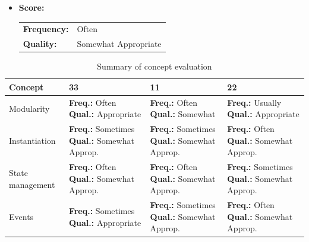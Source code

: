 \begin{itemize}
    \item \textbf{Score:}
    \begin{tabular}{ll}
        \textbf{Frequency:} & Often \\
        \textbf{Quality:}   & Somewhat Appropriate \\
    \end{tabular}
\end{itemize}



\renewcommand{\arraystretch}{1.1}

\begin{table}[h]
    \centering
    \footnotesize
    \begin{tabular}{
            >{\raggedright\arraybackslash}p{}
            >{\raggedright\arraybackslash}p{}
            >{\raggedright\arraybackslash}p{}
            >{\raggedright\arraybackslash}p{}
    }
        \hline
        \textbf{Concept} & \textbf{33} & \textbf{11} & \textbf{22} \\
        \hline

        Modularity
        & \textbf{Freq.:} Often \newline \textbf{Qual.:} Appropriate
        & \textbf{Freq.:} Often \newline \textbf{Qual.:} Somewhat
        & \textbf{Freq.:} Usually \newline \textbf{Qual.:} Appropriate \\

        Instantiation
        & \textbf{Freq.:} Sometimes \newline \textbf{Qual.:} Somewhat Approp.
        & \textbf{Freq.:} Sometimes \newline \textbf{Qual.:} Somewhat Approp.
        & \textbf{Freq.:} Often \newline \textbf{Qual.:} Somewhat Approp. \\

        State management
        & \textbf{Freq.:} Often \newline \textbf{Qual.:} Somewhat Approp.
        & \textbf{Freq.:} Often \newline \textbf{Qual.:} Somewhat Approp.
        & \textbf{Freq.:} Sometimes \newline \textbf{Qual.:} Somewhat Approp. \\

        Events
        & \textbf{Freq.:} Sometimes \newline \textbf{Qual.:} Appropriate
        & \textbf{Freq.:} Sometimes \newline \textbf{Qual.:} Somewhat Approp.
        & \textbf{Freq.:} Often \newline \textbf{Qual.:} Somewhat Approp. \\

        \hline
    \end{tabular}
    \caption{Summary of concept evaluation}\label{tab:ArtifactSummarytable}
\end{table}